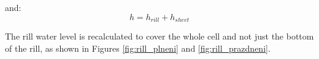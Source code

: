             and:
            \begin{equation}
               h = h_{rill} + h_{sheet}  
            \end{equation}

            The rill water level is recalculated to cover the whole cell and not just the
            bottom of the rill, as shown in Figures \ref{fig:rill_plneni} and
            \ref{fig:rill_prazdneni}.

